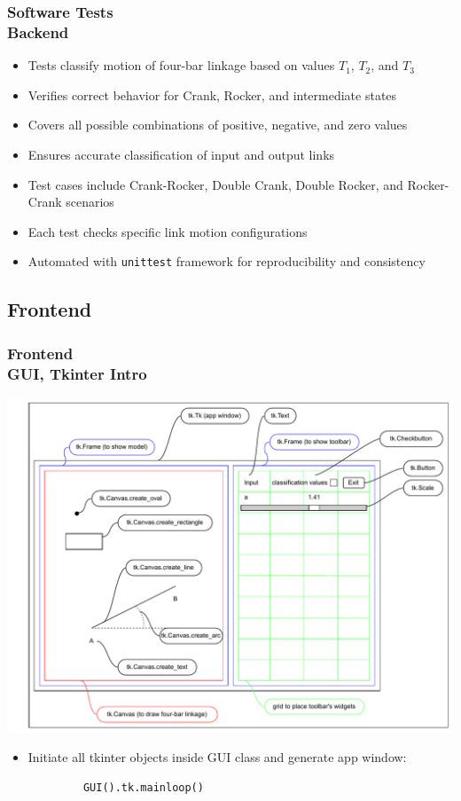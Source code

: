\documentclass[ucs,10pt]{beamer}
\begin{document}
\begin{frame}
    \frametitle{Software Tests \\
    \small \color{rwth-blue} Backend}
    
    \begin{itemize}
        \item Tests classify motion of four-bar linkage based on values \( T_1 \), \( T_2 \), and \( T_3 \)
        \item Verifies correct behavior for Crank, Rocker, and intermediate states
        \item Covers all possible combinations of positive, negative, and zero values
        \item Ensures accurate classification of input and output links
        \item Test cases include Crank-Rocker, Double Crank, Double Rocker, and Rocker-Crank scenarios
        \item Each test checks specific link motion configurations
        \item Automated with \texttt{unittest} framework for reproducibility and consistency
    \end{itemize}
    
\end{frame}

\subsection{Frontend}

\begin{frame}[fragile]
\frametitle{Frontend \\
	\small \color{rwth-blue} GUI, Tkinter Intro}
	\begin{center}
		\vspace*{-1mm}
		\includegraphics[width=0.78\linewidth]{./Figures/Implementation/GUI/tkinter_grid.pdf}
		\begin{itemize}
			\item Initiate all tkinter objects inside GUI class and generate app window:
		\end{itemize}
		\begin{lstlisting}
			GUI().tk.mainloop()
		\end{lstlisting}
	\end{center}
\end{frame}
\end{document}
